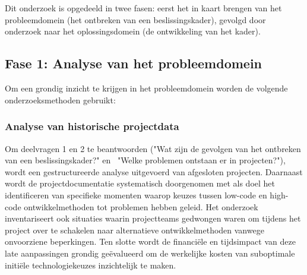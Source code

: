 
\chapter{}%
\label{ch:methodologie}


Dit onderzoek is opgedeeld in twee fasen: eerst het in kaart brengen van het probleemdomein (het ontbreken van een beslissingskader), gevolgd door onderzoek naar het oplossingsdomein (de ontwikkeling van het kader).
\section{Fase 1: Analyse van het probleemdomein}
Om een grondig inzicht te krijgen in het probleemdomein worden de volgende onderzoeksmethoden gebruikt:
\subsection{Analyse van historische projectdata}
Om deelvragen 1 en 2 te beantwoorden ("Wat zijn de gevolgen van het ontbreken van een beslissingskader?" \; \hbox{en} \, "Welke problemen ontstaan er in projecten?"), wordt een gestructureerde analyse uitgevoerd van afgesloten projecten. Daarnaast wordt de projectdocumentatie systematisch doorgenomen met als doel het identificeren van specifieke momenten waarop keuzes tussen low-code en high-code ontwikkelmethoden tot problemen hebben geleid. Het onderzoek inventariseert ook situaties waarin projectteams gedwongen waren om tijdens het project over te schakelen naar alternatieve ontwikkelmethoden vanwege onvoorziene beperkingen. Ten slotte wordt de financiële en tijdsimpact van deze late aanpassingen grondig geëvalueerd om de werkelijke kosten van suboptimale initiële technologiekeuzes inzichtelijk te maken.

